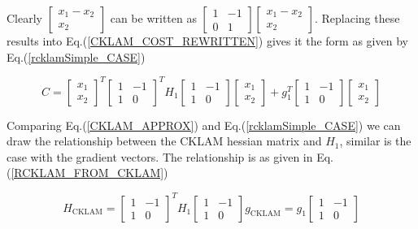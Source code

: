 Clearly $\begin{bmatrix} x_1-x_2 \\ x_2 \end{bmatrix}$ can be written as $\begin{bmatrix} 1 & -1\\ 0 & 1\end{bmatrix} \begin{bmatrix} x_1-x_2 \\ x_2 \end{bmatrix}$. Replacing these results into Eq.(\ref{CKLAM_COST_REWRITTEN}) gives it the form as given by Eq.(\ref{rcklamSimple_CASE})

\begin{equation}
	C = \begin{bmatrix} x_1 \\ x_2 \end{bmatrix} ^T\begin{bmatrix} 1 & -1\\ 1 & 0 \end{bmatrix}^T H_1\begin{bmatrix} 1 & -1\\ 1 & 0 \end{bmatrix} \begin{bmatrix} x_1 \\ x_2 \end{bmatrix} + g_1^T\begin{bmatrix} 1 & -1\\ 1 & 0 \end{bmatrix}\begin{bmatrix} x_1 \\ x_2 \end{bmatrix}
	\label{rcklamSimple_CASE}
\end{equation}

Comparing Eq.(\ref{CKLAM_APPROX}) and Eq.(\ref{rcklamSimple_CASE}) we can draw the relationship between the CKLAM hessian matrix and $H_1$, similar is the case with the gradient vectors. The relationship is as given in Eq.(\ref{RCKLAM_FROM_CKLAM}) 

\begin{subequations}
	\begin{equation}
		H_\mathrm{CKLAM} = \begin{bmatrix} 1 & -1\\ 1 & 0 \end{bmatrix}^T H_1\begin{bmatrix} 1 & -1\\ 1 & 0 \end{bmatrix}
	\end{equation}
	\begin{equation}
		g_\mathrm{CKLAM} = g_1\begin{bmatrix} 1 & -1\\ 1 & 0 \end{bmatrix}
	\end{equation}
	\label{RCKLAM_FROM_CKLAM}
\end{subequations}

